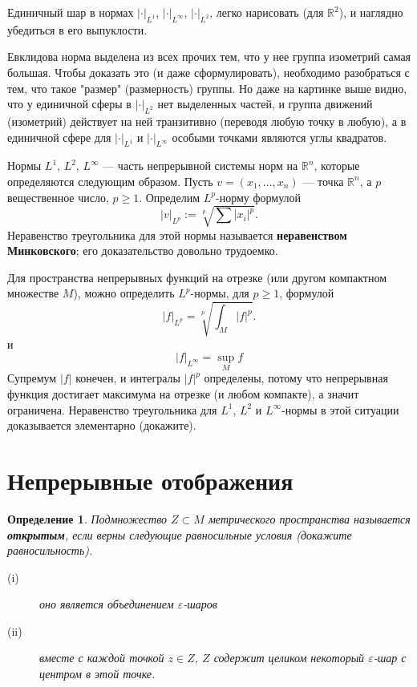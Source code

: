 \documentclass[12pt]{book}
\renewcommand{\epsilon}{\varepsilon}
\def\R{{\mathbb R}}
\theoremstyle{upshape}
\theoremstyle{generic}
\newtheorem{opredelenie}[teorema]{Определение}
\def\еза{\end{remark}}
\theoremstyle{upshapenonumber}
\newcommand{\следствие}{%
     \refstepcounter{teorema}
     {\noindent\bf Следствие \thechapter.\arabic{teorema}:\ }}
\newcommand{\пример}{%
     \refstepcounter{teorema}
     {\noindent\bf Пример \thechapter.\arabic{teorema}:\ }}
\newcommand{\лемма}{%
     \refstepcounter{teorema}
     {\noindent\bf Лемма \thechapter.\arabic{teorema}:\ }}
\newcommand{\теорема}{%
     \refstepcounter{teorema}
     {\noindent\bf Теорема \thechapter.\arabic{teorema}:\ }}
\newcommand{\утверждение}{%
     \refstepcounter{teorema}
     {\noindent\bf Утверждение \thechapter.\arabic{teorema}:\ }}
\def\хфилл{\hfill}
\def\бф{\bf}
\def\ем{\em}
\def\ез{\end{zadacha}}
\def\еу{\end{ukazanie}}
\def\определение{\begin{opredelenie}}
\def\ео{\end{opredelenie}}
\def\енум{\begin{enumerate}}
\def\ее{\end{enumerate}}
\begin{document}
 

Единичный шар в нормах $|\cdot|_{L^1}$, 
$|\cdot|_{L^\infty}$, $|\cdot|_{L^2}$, легко нарисовать
(для $\R^2$), и наглядно убедиться в его выпуклости.



\хфилл

Евклидова норма выделена из всех прочих тем,
что у нее группа изометрий самая большая.
Чтобы доказать это (и даже сформулировать),
необходимо разобраться с тем, что такое "размер" (размерность)
группы. Но даже на картинке выше видно, что у единичной
сферы в $|\cdot|_{L^2}$ нет выделенных частей,
и группа движений (изометрий) действует на ней
транзитивно (переводя любую точку в любую), 
а в единичной сфере для $|\cdot|_{L^1}$ и $|\cdot|_{L^\infty}$
особыми точками являются углы квадратов.

\hfill

Нормы $L^1$, $L^2$, $L^\infty$ --- часть непрерывной системы
норм на $\R^n$, которые определяются следующим образом.
Пусть $v= (x_1, ..., x_n)$ --- точка $\R^n$, а $p$ вещественное
число, $p\geq 1$.  Определим $L^p$-норму формулой
\[ |v|_{L^p}:= \sqrt[p]{\sum |x_i|^p}.\] 
Неравенство треугольника для этой нормы называется
{\бф неравенством Минковского}; его доказательство
довольно трудоемко. 

\хфилл

Для пространства непрерывных функций на отрезке (или другом
компактном множестве $M$), можно определить $L^p$-нормы,
для $p\geq  1$, формулой
\[
|f|_{L^p}= \sqrt[p]{\int_M |f|^p}.
\]
и
\[
|f|_{L^\infty}= \sup_M f
\]
Супремум $|f|$ конечен, и интегралы $|f|^p$
определены, потому что непрерывная функция достигает
максимума на отрезке (и любом компакте), а значит ограничена. 
Неравенство треугольника для $L^1$, $L^2$ и $L^\infty$-нормы
в этой ситуации доказывается элементарно (докажите). 




\section{Непрерывные отображения}




\определение
Подмножество $Z\subset M$ метрического пространства
называется {\бф открытым}, если 
верны следующие равносильные условия (докажите равносильность).
\begin{description}
\item[(i)] оно является объединением
$\epsilon$-шаров 
\item[(ii)] вместе с каждой точкой $z\in Z$, $Z$ содержит целиком
некоторый $\epsilon$-шар с центром в этой точке.
\end{description}
\ео
\end{document}
